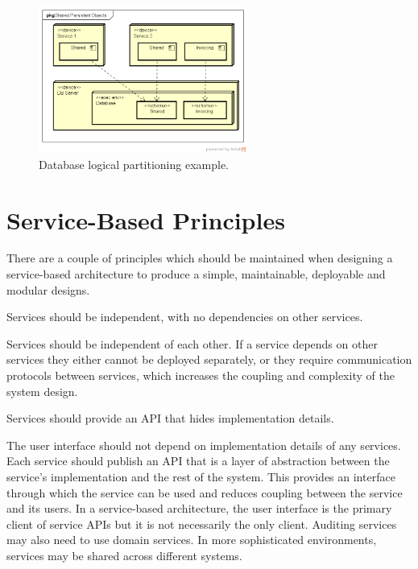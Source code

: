 \begin{figure}[h!]
    \centering
    \includegraphics[trim=37 37 20 44,clip,width=0.61\textwidth]{diagrams/db-logical-partitioning.png}
    \caption{Database logical partitioning example.}
    \label{fig:db-logical-partitioning}
\end{figure}

\section{Service-Based Principles}
There are a couple of principles which should be maintained when designing a service-based architecture
to produce a simple, maintainable, deployable and modular designs.

\vspace{1mm}
\begin{definition}\label{independent-service}
    Services should be independent, with no dependencies on other services.
\end{definition}

Services should be independent of each other.
If a service depends on other services they either cannot be deployed separately,
or they require communication protocols between services, which increases the coupling and complexity of the system design.

\vspace{1mm}
\begin{definition}\label{api-abstraction}
    Services should provide an API that hides implementation details.
\end{definition}

The user interface should not depend on implementation details of any services.
Each service should publish an API that is a layer of abstraction between the service's implementation and the rest of the system.
This provides an interface through which the service can be used and reduces coupling between the service and its users.
In a service-based architecture, the user interface is the primary client of service APIs but it is not necessarily the only client.
Auditing services may also need to use domain services.
In more sophisticated environments, services may be shared across different systems.


